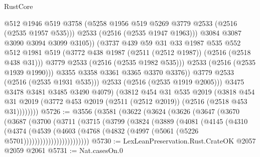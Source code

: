 \begin{lexlean}{RustCore}
\begin{coremodule}
                            @512
                            @1946
                            @519
                            @3758
                            (@5258 @1956 @519 @5269 @3779 @2533 (@2516 (@2535 @1957 @535)))
                            @2533
                            (@2516 (@2535 @1947 @1963)))
                          @3084
                          @3087
                          @3090
                          @3094
                          @3099
                          @3105))
                      (@3737
                        @439
                        @59
                        @31
                        @33
                        @1987
                        @535
                        @552
                        @512
                        @1981
                        @519
                        (@3772 @438 @1987 (@2511 (@2512 @1987)) (@2516 (@2518 @438 @31)))
                        @3779
                        @2533
                        (@2516 (@2535 @1982 @535)))
                      @2533
                      (@2516 (@2535 @1939 @1990)))
                    @3355
                    @3358
                    @3361
                    @3365
                    @3370
                    @3376))
                @3779
                @2533
                (@2516 (@2535 @1931 @535)))
              @2533
              (@2516 (@2535 @1919 @2005)))
            @3475
            @3478
            @3481
            @3485
            @3490
            @4079)
          (@3812
            @454
            @31
            @535
            @2019
            (@3818
              @454
              @31
              @2019
              (@3772 @453 @2019 (@2511 (@2512 @2019)) (@2516 (@2518 @453 @31))))))))
@5726 := @3556
    (@3581
      (@3622
        (@3624
          (@3626
            (@3647
              (@3670
                (@3687
                  (@3700
                    (@3711
                      (@3715
                        (@3799
                          (@3824
                            (@3889
                              (@4081
                                (@4145
                                  (@4310
                                    (@4374
                                      (@4539
                                        (@4603
                                          (@4768
                                            (@4832
                                              (@4997 (@5061 (@5226 @5701))))))))))))))))))))))))
@5730 := LexLeanPreservation.Rust.CrateOK @2057 @2059 @2061
@5731 := Nat.casesOn.{0}

\end{coremodule}
\end{lexlean}
